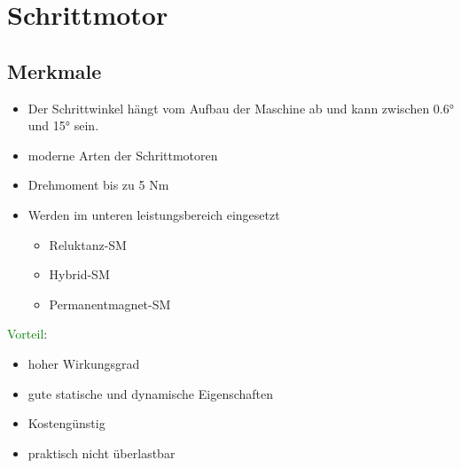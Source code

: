 \section{Schrittmotor}
\subsection{Merkmale}
    \begin{itemize}
        \item Der Schrittwinkel hängt vom Aufbau der Maschine ab und kann zwischen 0.6° und 15° sein.
        \item moderne Arten der Schrittmotoren
        \item Drehmoment bis zu 5 Nm
        \item Werden im unteren leistungsbereich eingesetzt
        \begin{itemize}
            \item Reluktanz-SM
            \item Hybrid-SM
            \item Permanentmagnet-SM
        \end{itemize}
    \end{itemize}
    \textcolor{green}{Vorteil}:
    \begin{itemize}
        \item hoher Wirkungsgrad
        \item gute statische und dynamische Eigenschaften
        \item Kostengünstig
        \item praktisch nicht überlastbar
    \end{itemize}

